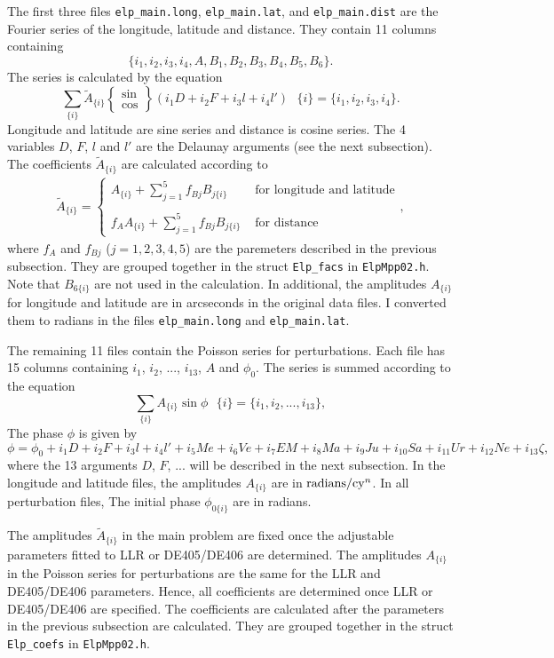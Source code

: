 \documentclass[12pt]{article}
\newcommand \beq {\begin{equation}}
\newcommand \eeq {\end{equation}}
\newcommand \beqn {\begin{eqnarray}}
\newcommand \eeqn {\end{eqnarray}}
\begin{document}
The first three files {\tt elp\_main.long}, {\tt elp\_main.lat}, and 
{\tt elp\_main.dist} are the Fourier series of the longitude, latitude and distance. 
They contain 11 columns containing 
\[
\{ i_1, i_2, i_3, i_4, A, B_1, B_2, B_3, B_4, B_5, B_6\} .
\]
The series is calculated by the equation 
\beq
  \sum_{\{ i\} } \tilde{A}_{\{ i \}} \left\{ \begin{array}{l} \sin \\ \cos \end{array}
\right \} 
(i_1 D + i_2 F + i_3 l + i_4 l') \ \ \ \{ i \} = \{ i_1, i_2, i_3, i_4 \} .
\eeq
Longitude and latitude are sine series and distance is cosine series. The 4 variables 
$D$, $F$, $l$ and $l'$ are the Delaunay arguments (see the next subsection). The coefficients 
$\tilde{A}_{\{ i \}}$ are calculated according to 
\beqn
  \tilde{A}_{\{ i \}} = \left \{ \begin{array}{ll} 
A_{\{ i \}} + \sum\limits_{j=1}^5 f_{Bj} B_{j\{ i \}} & \mbox{ for longitude and latitude} \\  \\
f_A A_{\{ i \}} + \sum\limits_{j=1}^5 f_{Bj} B_{j\{ i \}} & \mbox{ for distance} \end{array}\right. ,
\eeqn
where $f_A$ and $f_{Bj}$ ($j=1,2,3,4,5$) are the paremeters described in the previous 
subsection. They are grouped together in the struct {\tt Elp\_facs} in {\tt ElpMpp02.h}. 
Note that $B_{6 \{i \}}$ are not used in the calculation. In additional, the amplitudes
$A_{\{ i \}}$ for longitude and latitude are in arcseconds in the original data 
files. I converted them to radians in the files {\tt elp\_main.long} and 
{\tt elp\_main.lat}.

The remaining 11 files contain the Poisson series for perturbations. Each file 
has 15 columns containing $i_1$, $i_2$, ..., $i_{13}$, $A$ and $\phi_0$. The series 
is summed according to the equation 
\beq
  \sum_{\{i\}} A_{\{i\}} \sin \phi \ \ \ \{i\} = \{ i_1, i_2, ..., i_{13} \} ,
\eeq
The phase $\phi$ is given by 
\beq 
  \phi = \phi_0 + i_1 D + i_2 F + i_3 l + i_4 l' + i_5 Me + i_6 Ve + i_7 EM + i_8 Ma 
+ i_9 Ju + i_{10} Sa + i_{11} Ur + i_{12} Ne + i_{13} \zeta ,
\label{eq:phi}
\eeq
where the 13 arguments $D$, $F$, ... will be described in the next subsection. 
In the longitude and latitude files, the amplitudes $A_{\{i\}}$ are in 
${\rm radians}/{\rm cy}^n$. In all perturbation files, The initial phase 
$\phi_{0 \{i \}}$ are in radians.

The amplitudes $\tilde{A}_{\{i\}}$ in the main problem are fixed once the 
adjustable parameters fitted to LLR or DE405/DE406 are determined. The 
amplitudes $A_{\{i\}}$ in the Poisson series 
for perturbations are the same for the LLR and DE405/DE406 parameters. Hence, all 
coefficients are determined once LLR or DE405/DE406 are specified. The coefficients 
are calculated after the parameters in the previous subsection are calculated. 
They are grouped together in the struct {\tt Elp\_coefs} in {\tt ElpMpp02.h}. 
\end{document}

